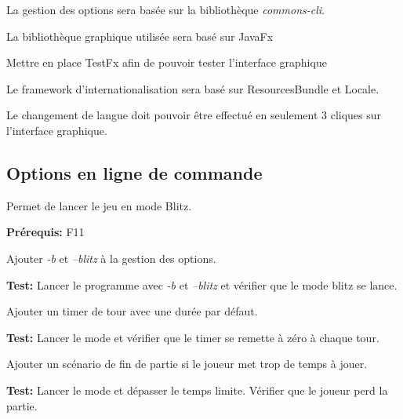 \documentclass{article}
\begin{document}
\begin{nonfunctionnalneedbox}
    La gestion des options sera basée sur la bibliothèque \textit{commons-cli}.
\end{nonfunctionnalneedbox}

\begin{nonfunctionnalneedbox}
    La bibliothèque graphique utilisée sera basé sur JavaFx
    \begin{subneedbox}
        Mettre en place TestFx afin de pouvoir tester l'interface graphique
    \end{subneedbox}
\end{nonfunctionnalneedbox}

\begin{nonfunctionnalneedbox}[F13: Internationalisation]
    Le framework d'internationalisation sera basé sur ResourcesBundle et Locale.
    \begin{subneedbox}
        Le changement de langue doit pouvoir être effectué en seulement 3 cliques
        sur l'interface graphique.
    \end{subneedbox}
\end{nonfunctionnalneedbox}

\subsection{Options en ligne de commande}

\begin{needbox}
    Permet de lancer le jeu en mode Blitz.

    \textbf{Prérequis:} F11
    \begin{subneedbox}
        Ajouter \textit{-b} et \textit{--blitz} à la gestion des options.

        \textbf{Test:} Lancer le programme avec \textit{-b} et \textit{--blitz} et vérifier que le mode blitz se lance.
    \end{subneedbox}
    \begin{subneedbox}
        Ajouter un timer de tour avec une durée par défaut.

        \textbf{Test:} Lancer le mode et vérifier que le timer se remette à zéro à chaque tour.
    \end{subneedbox}
    \begin{subneedbox}
        Ajouter un scénario de fin de partie si le joueur met trop de temps à jouer.

        \textbf{Test:} Lancer le mode et dépasser le temps limite. Vérifier que le joueur perd la partie.
    \end{subneedbox}
\end{needbox}
\end{document}
